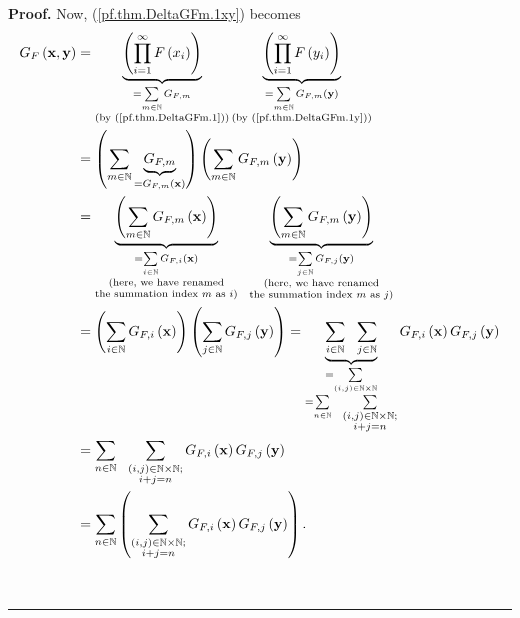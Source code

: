 \documentclass[numbers=enddot,12pt,final,onecolumn,notitlepage]{scrartcl}%
\theoremstyle{definition}
\newenvironment{proof}[1][Proof]{\noindent\textbf{#1.} }{\ \rule{0.5em}{0.5em}}
\let\sumnonlimits\sum
\let\prodnonlimits\prod
\renewcommand{\sum}{\sumnonlimits\limits}
\renewcommand{\prod}{\prodnonlimits\limits}
\newenvironment{verlong}{}{}
\begin{document}
\begin{verlong}
\begin{proof}
Now, (\ref{pf.thm.DeltaGFm.1xy}) becomes%
\begin{align}
G_{F}\left(  \mathbf{x},\mathbf{y}\right)   &  =\underbrace{\left(
\prod_{i=1}^{\infty}F\left(  x_{i}\right)  \right)  }_{\substack{=\sum
_{m\in\mathbb{N}}G_{F,m}\\\text{(by (\ref{pf.thm.DeltaGFm.1}))}}%
}\underbrace{\left(  \prod_{i=1}^{\infty}F\left(  y_{i}\right)  \right)
}_{\substack{=\sum_{m\in\mathbb{N}}G_{F,m}\left(  \mathbf{y}\right)
\\\text{(by (\ref{pf.thm.DeltaGFm.1y}))}}}\nonumber\\
&  =\left(  \sum_{m\in\mathbb{N}}\underbrace{G_{F,m}}_{=G_{F,m}\left(
\mathbf{x}\right)  }\right)  \left(  \sum_{m\in\mathbb{N}}G_{F,m}\left(
\mathbf{y}\right)  \right) \nonumber\\
&  =\underbrace{\left(  \sum_{m\in\mathbb{N}}G_{F,m}\left(  \mathbf{x}\right)
\right)  }_{\substack{=\sum_{i\in\mathbb{N}}G_{F,i}\left(  \mathbf{x}\right)
\\\text{(here, we have renamed}\\\text{the summation index }m\text{ as
}i\text{)}}}\ \ \underbrace{\left(  \sum_{m\in\mathbb{N}}G_{F,m}\left(
\mathbf{y}\right)  \right)  }_{\substack{=\sum_{j\in\mathbb{N}}G_{F,j}\left(
\mathbf{y}\right)  \\\text{(here, we have renamed}\\\text{the summation index
}m\text{ as }j\text{)}}}\nonumber\\
&  =\left(  \sum_{i\in\mathbb{N}}G_{F,i}\left(  \mathbf{x}\right)  \right)
\left(  \sum_{j\in\mathbb{N}}G_{F,j}\left(  \mathbf{y}\right)  \right)
=\underbrace{\sum_{i\in\mathbb{N}}\ \ \sum_{j\in\mathbb{N}}}_{\substack{=\sum
_{\left(  i,j\right)  \in\mathbb{N}\times\mathbb{N}}\\=\sum_{n\in\mathbb{N}%
}\ \ \sum_{\substack{\left(  i,j\right)  \in\mathbb{N}\times\mathbb{N}%
;\\i+j=n}}}}G_{F,i}\left(  \mathbf{x}\right)  G_{F,j}\left(  \mathbf{y}\right)
\nonumber\\
&  =\sum_{n\in\mathbb{N}}\ \ \sum_{\substack{\left(  i,j\right)  \in
\mathbb{N}\times\mathbb{N};\\i+j=n}}G_{F,i}\left(  \mathbf{x}\right)
G_{F,j}\left(  \mathbf{y}\right) \nonumber\\
&  =\sum_{n\in\mathbb{N}}\left(  \sum_{\substack{\left(  i,j\right)
\in\mathbb{N}\times\mathbb{N};\\i+j=n}}G_{F,i}\left(  \mathbf{x}\right)
G_{F,j}\left(  \mathbf{y}\right)  \right)  . \label{pf.thm.DeltaGFm.4}%
\end{align}



\end{proof}
\end{verlong}
\end{document}
